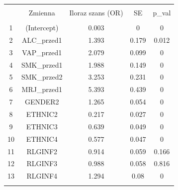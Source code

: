 
\begin{tabular}{@{\extracolsep{5pt}} ccccc} 
\\[-1.8ex]\hline 
\hline \\[-1.8ex] 
 & Zmienna & Iloraz szans (OR) & SE & p\_val \\ 
\hline \\[-1.8ex] 
1 & (Intercept) & 0.003 & 0 & 0 \\ 
2 & ALC\_przed1 & 1.393 & 0.179 & 0.012 \\ 
3 & VAP\_przed1 & 2.079 & 0.099 & 0 \\ 
4 & SMK\_przed1 & 1.988 & 0.149 & 0 \\ 
5 & SMK\_przed2 & 3.253 & 0.231 & 0 \\ 
6 & MRJ\_przed1 & 5.393 & 0.439 & 0 \\ 
7 & GENDER2 & 1.265 & 0.054 & 0 \\ 
8 & ETHNIC2 & 0.217 & 0.027 & 0 \\ 
9 & ETHNIC3 & 0.639 & 0.049 & 0 \\ 
10 & ETHNIC4 & 0.577 & 0.047 & 0 \\ 
11 & RLGINF2 & 0.914 & 0.059 & 0.166 \\ 
12 & RLGINF3 & 0.988 & 0.058 & 0.816 \\ 
13 & RLGINF4 & 1.294 & 0.08 & 0 \\ 
\hline \\[-1.8ex] 
\end{tabular} 

